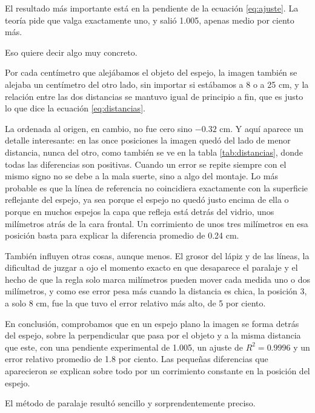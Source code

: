 El resultado más importante está en la pendiente de la ecuación \eqref{eq:ajuste}. La teoría pide que valga exactamente uno, y salió 1.005, apenas medio por ciento más.

Eso quiere decir algo muy concreto.

Por cada centímetro que alejábamos el objeto del espejo, la imagen también se alejaba un centímetro del otro lado, sin importar si estábamos a 8 o a 25 cm, y la relación entre las dos distancias se mantuvo igual de principio a fin, que es justo lo que dice la ecuación \eqref{eq:distancias}.

La ordenada al origen, en cambio, no fue cero sino $-0.32$ cm. Y aquí aparece un detalle interesante: en las once posiciones la imagen quedó del lado de menor distancia, nunca del otro, como también se ve en la tabla \ref{tab:distancias}, donde todas las diferencias son positivas. Cuando un error se repite siempre con el mismo signo no se debe a la mala suerte, sino a algo del montaje. Lo más probable es que la línea de referencia no coincidiera exactamente con la superficie reflejante del espejo, ya sea porque el espejo no quedó justo encima de ella o porque en muchos espejos la capa que refleja está detrás del vidrio, unos milímetros atrás de la cara frontal. Un corrimiento de unos tres milímetros en esa posición basta para explicar la diferencia promedio de 0.24 cm.

También influyen otras cosas, aunque menos. El grosor del lápiz y de las líneas, la dificultad de juzgar a ojo el momento exacto en que desaparece el paralaje y el hecho de que la regla solo marca milímetros pueden mover cada medida uno o dos milímetros, y como ese error pesa más cuando la distancia es chica, la posición 3, a solo 8 cm, fue la que tuvo el error relativo más alto, de 5 por ciento.

En conclusión, comprobamos que en un espejo plano la imagen se forma detrás del espejo, sobre la perpendicular que pasa por el objeto y a la misma distancia que este, con una pendiente experimental de 1.005, un ajuste de $R^2 = 0.9996$ y un error relativo promedio de 1.8 por ciento. Las pequeñas diferencias que aparecieron se explican sobre todo por un corrimiento constante en la posición del espejo.

El método de paralaje resultó sencillo y sorprendentemente preciso.

